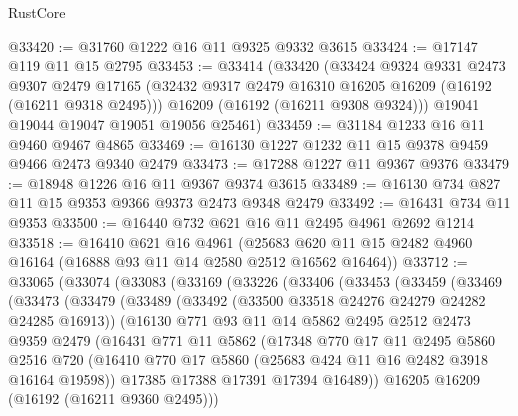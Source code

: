 \begin{lexlean}{RustCore}
\begin{coremodule}
@33420 := @31760 @1222 @16 @11 @9325 @9332 @3615
@33424 := @17147 @119 @11 @15 @2795
@33453 := @33414
    (@33420
      (@33424
        @9324
        @9331
        @2473
        @9307
        @2479
        @17165
        (@32432 @9317 @2479 @16310 @16205 @16209 (@16192 (@16211 @9318 @2495)))
        @16209
        (@16192 (@16211 @9308 @9324)))
      @19041
      @19044
      @19047
      @19051
      @19056
      @25461)
@33459 := @31184 @1233 @16 @11 @9460 @9467 @4865
@33469 := @16130 @1227 @1232 @11 @15 @9378 @9459 @9466 @2473 @9340 @2479
@33473 := @17288 @1227 @11 @9367 @9376
@33479 := @18948 @1226 @16 @11 @9367 @9374 @3615
@33489 := @16130 @734 @827 @11 @15 @9353 @9366 @9373 @2473 @9348 @2479
@33492 := @16431 @734 @11 @9353
@33500 := @16440 @732 @621 @16 @11 @2495 @4961 @2692 @1214
@33518 := @16410
    @621
    @16
    @4961
    (@25683 @620 @11 @15 @2482 @4960 @16164 (@16888 @93 @11 @14 @2580 @2512 @16562 @16464))
@33712 := @33065
    (@33074
      (@33083
        (@33169
          (@33226
            (@33406
              (@33453
                (@33459
                  (@33469
                    (@33473
                      (@33479
                        (@33489
                          (@33492 (@33500 @33518 @24276 @24279 @24282 @24285 @16913))
                          (@16130
                            @771
                            @93
                            @11
                            @14
                            @5862
                            @2495
                            @2512
                            @2473
                            @9359
                            @2479
                            (@16431
                              @771
                              @11
                              @5862
                              (@17348
                                @770
                                @17
                                @11
                                @2495
                                @5860
                                @2516
                                @720
                                (@16410
                                  @770
                                  @17
                                  @5860
                                  (@25683 @424 @11 @16 @2482 @3918 @16164 @19598))
                                @17385
                                @17388
                                @17391
                                @17394
                                @16489))
                            @16205
                            @16209
                            (@16192 (@16211 @9360 @2495)))

\end{coremodule}
\end{lexlean}
